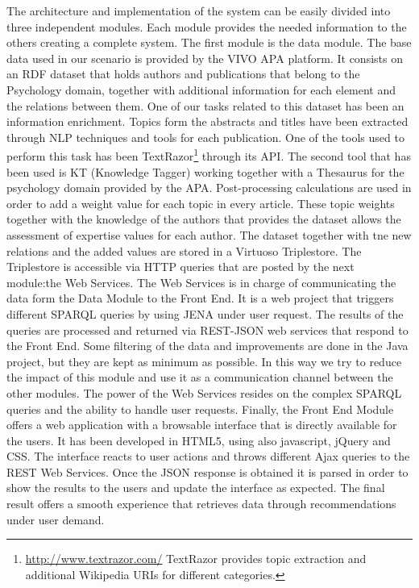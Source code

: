 The architecture and implementation of the system can be easily divided into three independent modules. Each module provides the needed information to the others creating a complete system.
The first module is the data module. The base data used in our scenario is provided by the VIVO APA platform. It consists on an RDF dataset that holds authors and publications that belong to the Psychology domain, together with additional information for each element and the relations between them. One of our tasks related to this dataset has been an information enrichment. Topics form the abstracts and titles have been extracted through NLP techniques and tools for each publication. One of the tools used to perform this task has been TextRazor\footnote{\url{http://www.textrazor.com/} TextRazor provides topic extraction and additional Wikipedia URIs for different categories.} through its API. The second tool that has been used is KT (Knowledge Tagger) working together with a Thesaurus for the psychology domain provided by the APA. Post-processing calculations are used in order to add a weight value for each topic in every article. These topic weights together with the knowledge of the authors that provides the dataset allows the assessment of expertise values for each author. The dataset together with tne new relations and the added values are stored in a Virtuoso Triplestore. The Triplestore is accessible via HTTP queries that are posted by the next module:the Web Services.
The Web Services is in charge of communicating the data form the Data Module to the Front End. It is a web project that triggers different SPARQL queries by using JENA under user request. The results of the queries are processed and returned via REST-JSON web services that respond to the Front End. Some filtering of the data and improvements are done in the Java project, but they are kept as minimum as possible. In this way we try to reduce the impact of this module and use it as a communication channel between the other modules. The power of the Web Services resides on the complex SPARQL queries and the ability to handle user requests.
Finally, the Front End Module offers a web application with a browsable interface that is directly available for the users. It has been developed in HTML5, using also javascript, jQuery and CSS. The interface reacts to user actions and throws different Ajax queries to the REST Web Services. Once the JSON response is obtained it is parsed in order to show the results to the users and update the interface as expected. The final result offers a smooth experience that retrieves data through recommendations under user demand.\\
